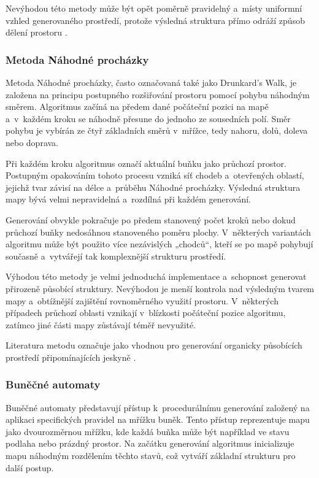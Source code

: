 \documentclass[
   program=itk,
   biblatex,
   figures=true,
   tables=true,
   glossaries,
   index
]{kidiplom}
\begin{document}
Nevýhodou této metody může být opět poměrně pravidelný a~místy uniformní vzhled generovaného prostředí, protože výsledná struktura přímo odráží způsob dělení prostoru \cite{Linden2014,Shaker2016}.

\subsubsection{Metoda Náhodné procházky}

Metoda Náhodné procházky, často označovaná také jako Drunkard's Walk, je založena na principu postupného rozšiřování prostoru pomocí pohybu náhodným směrem. Algoritmus začíná na předem dané počáteční pozici na mapě a~v~každém kroku se náhodně přesune do jednoho ze sousedních polí. Směr pohybu je vybírán ze čtyř základních směrů v~mřížce, tedy nahoru, dolů, doleva nebo doprava.

Při každém kroku algoritmus označí aktuální buňku jako průchozí prostor. Postupným opakováním tohoto procesu vzniká síť chodeb a~otevřených oblastí, jejichž tvar závisí na délce a~průběhu Náhodné procházky. Výsledná struktura mapy bývá velmi nepravidelná a~rozdílná při každém generování.

Generování obvykle pokračuje po předem stanovený počet kroků nebo dokud průchozí buňky nedosáhnou stanoveného poměru plochy. V~některých variantách algoritmu může být použito více nezávislých „chodců“, kteří se po mapě pohybují současně a~vytvářejí tak komplexnější strukturu prostředí.

Výhodou této metody je velmi jednoduchá implementace a~schopnost generovat přirozeně působící struktury. Nevýhodou je menší kontrola nad výsledným tvarem mapy a~obtížnější zajištění rovnoměrného využití prostoru. V~některých případech průchozí oblasti vznikají v~blízkosti počáteční pozice algoritmu, zatímco jiné části mapy zůstávají téměř nevyužité.

Literatura metodu označuje jako vhodnou pro generování organicky působících prostředí připomínajících jeskyně \cite{Shaker2016}.


\subsubsection{Buněčné automaty}

Buněčné automaty představují přístup k~procedurálnímu generování založený na aplikaci specifických pravidel na mřížku buněk. Tento přístup reprezentuje mapu jako dvourozměrnou mřížku, kde každá buňka může být například ve stavu podlaha nebo prázdný prostor. Na začátku generování algoritmus inicializuje mapu náhodným rozdělením těchto stavů, což vytváří základní strukturu pro další postup.
\end{document}
